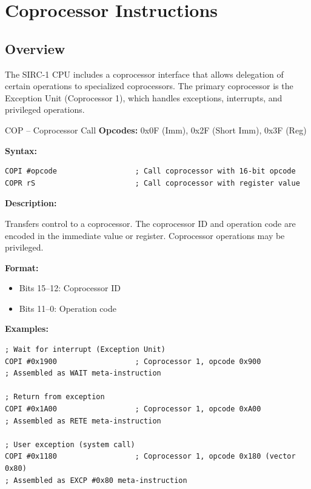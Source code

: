 \chapter{Coprocessor Instructions}
\label{ch:coprocessor}

\section{Overview}

The SIRC-1 CPU includes a coprocessor interface that allows delegation of certain operations to specialized
coprocessors. The primary coprocessor is the Exception Unit (Coprocessor 1), which handles exceptions, interrupts, and
privileged operations.

\begin{instructionbox}{COP -- Coprocessor Call}
	\textbf{Opcodes:} 0x0F (Imm), 0x2F (Short Imm), 0x3F (Reg)

	\textbf{Syntax:}
	\begin{lstlisting}
COPI #opcode                  ; Call coprocessor with 16-bit opcode
COPR rS                       ; Call coprocessor with register value
\end{lstlisting}

	\textbf{Description:}

	Transfers control to a coprocessor. The coprocessor ID and operation code are encoded in the immediate value or
	register. Coprocessor operations may be privileged.

	\textbf{Format:}
	\begin{itemize}
		\item Bits 15--12: Coprocessor ID
		\item Bits 11--0: Operation code
	\end{itemize}

	\textbf{Examples:}
	\begin{lstlisting}
; Wait for interrupt (Exception Unit)
COPI #0x1900                  ; Coprocessor 1, opcode 0x900
; Assembled as WAIT meta-instruction

; Return from exception
COPI #0x1A00                  ; Coprocessor 1, opcode 0xA00
; Assembled as RETE meta-instruction

; User exception (system call)
COPI #0x1180                  ; Coprocessor 1, opcode 0x180 (vector 0x80)
; Assembled as EXCP #0x80 meta-instruction
\end{lstlisting}

\end{instructionbox}

